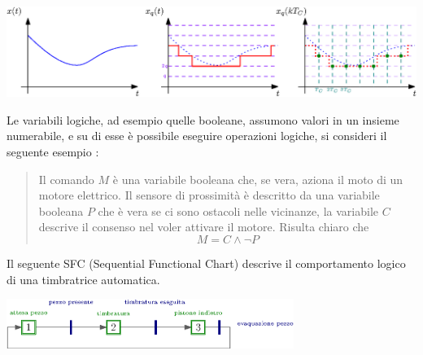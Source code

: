 \documentclass[10pt, letterpaper]{report}
\begin{document}
\begin{center}
    \includegraphics[width=1\textwidth ]{images/segnale.eps}
\end{center}
Le variabili logiche, ad esempio quelle booleane, assumono valori in un insieme numerabile, e su di esse 
è possibile eseguire operazioni logiche, si consideri il seguente esempio : \begin{quote}
    \color{gray}
    Il comando $M$ è una variabile booleana che, se vera, aziona il moto di un motore elettrico. 
    Il sensore di prossimità è descritto da una variabile booleana $P$ che è vera se ci sono 
    ostacoli nelle vicinanze, la variabile $C$ descrive il consenso nel voler attivare il motore.\acc 
    Risulta chiaro che $$ M= C \land \lnot P$$\color{black}
\end{quote}
Il seguente SFC (Sequential Functional Chart) descrive il comportamento logico di una timbratrice 
automatica.\begin{center}
    \includegraphics[width=0.7\textwidth ]{images/timbratrice.eps}
\end{center}
\flowerLine 
\end{document}
